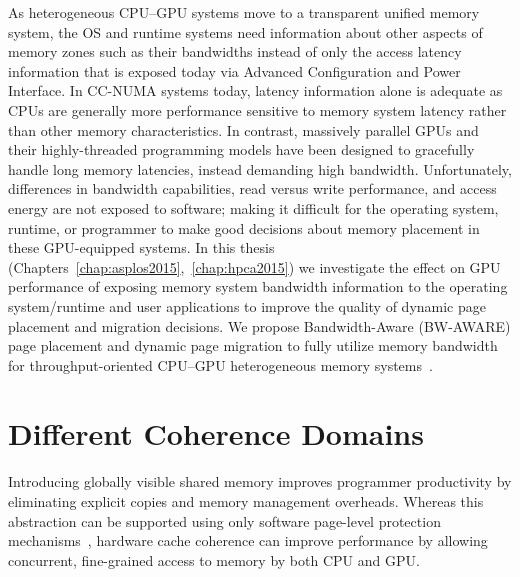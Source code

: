 As heterogeneous CPU--GPU systems move to a transparent unified memory system,
the OS and runtime systems need information about other aspects of memory zones
such as their bandwidths instead of only the access latency information that is
exposed today via Advanced Configuration and Power Interface. In CC-NUMA
systems today, latency information alone is adequate as CPUs are generally more
performance sensitive to memory system latency rather than other memory
characteristics. In contrast, massively parallel GPUs and their highly-threaded
programming models have been designed to gracefully handle long memory
latencies, instead demanding high bandwidth. Unfortunately, differences in
bandwidth capabilities, read versus write performance, and access energy are not
exposed to software; making it difficult for the operating system, runtime, or
programmer to make good decisions about memory placement in these GPU-equipped
systems. In this thesis (Chapters~\ref{chap:asplos2015},~\ref{chap:hpca2015}) we
investigate the effect on GPU performance of exposing memory system bandwidth
information to the operating system/runtime and user applications to improve the
quality of dynamic page placement and migration decisions. We propose
Bandwidth-Aware (BW-AWARE) page placement and dynamic page migration to fully
utilize memory bandwidth for throughput-oriented CPU--GPU heterogeneous memory
systems~\cite{ref:agarwal:hpca2015,ref:agarwal:asplos2015}.

\section{Different Coherence Domains}
Introducing globally visible shared memory improves programmer productivity by
eliminating explicit copies and memory management overheads. Whereas this
abstraction can be supported using only software page-level protection
mechanisms~\cite{UVM, HSA}, hardware cache coherence can improve performance by
allowing concurrent, fine-grained access to memory by both CPU and GPU.

